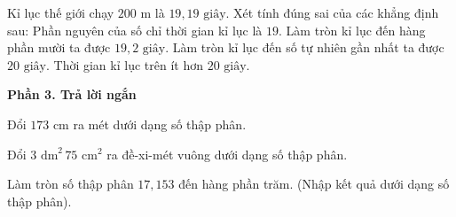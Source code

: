 \begin{ex} %
Kỉ lục thế giới chạy $200\text{ m}$ là $19{,}19\text{ giây}$. Xét tính đúng sai của các khẳng định sau:
\choiceTF
{\True Phần nguyên của số chỉ thời gian kỉ lục là $19$.}
{\True Làm tròn kỉ lục đến hàng phần mười ta được $19{,}2\text{ giây}$.}
{Làm tròn kỉ lục đến số tự nhiên gần nhất ta được $20\text{ giây}$.}
{\True Thời gian kỉ lục trên ít hơn $20\text{ giây}$.}
\end{ex}

\textbf{Phần 3. Trả lời ngắn}

\begin{ex} %
Đổi $173\text{ cm}$ ra mét dưới dạng số thập phân.
\end{ex}

\begin{ex} %
Đổi $3\text{ dm}^2\,75\text{ cm}^2$ ra đề-xi-mét vuông dưới dạng số thập phân.
\end{ex}

\begin{ex} %
Làm tròn số thập phân $17{,}153$ đến hàng phần trăm. (Nhập kết quả dưới dạng số thập phân).
\end{ex}

